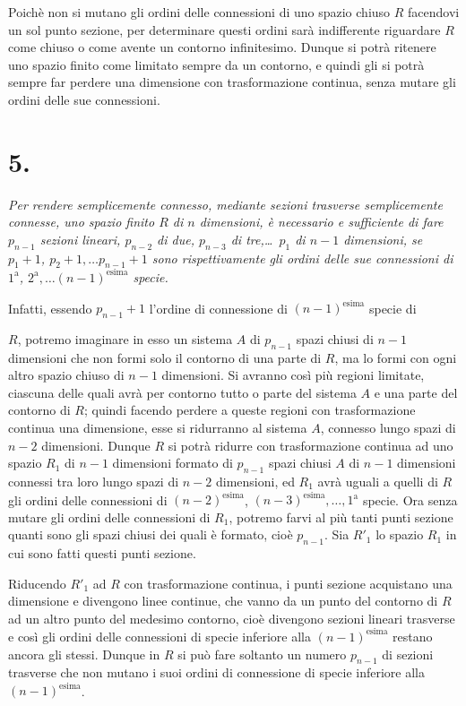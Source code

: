\documentclass{article}
\begin{document}
Poichè non si mutano gli ordini delle connessioni di uno spazio chiuso $R$ facendovi un sol punto sezione, per determinare questi ordini sarà indifferente riguardare $R$ come chiuso o come avente un contorno infinitesimo. Dunque si potrà ritenere uno spazio finito come limitato sempre da un contorno, e quindi gli si potrà sempre far perdere una dimensione con trasformazione continua, senza mutare gli ordini delle sue connessioni.

\section*{5.}

\emph{Per rendere semplicemente connesso, mediante sezioni trasverse semplicemente connesse, uno spazio finito $R$ di $n$ dimensioni, è necessario e sufficiente di fare $p_{n-1}$ sezioni lineari, $p_{n-2}$ di due, $p_{n-3}$ di tre,\ldots\ $p_{1}$ di $n-1$ dimensioni, se $p_{1}+1$, $p_{2}+1,\ldots p_{n-1}+1$ sono rispettivamente gli ordini delle sue connessioni di $1^{\text{a}}$, $2^{\text{a}},\ldots (n-1)^{\text{esima}}$ specie.}

Infatti, essendo $p_{n-1}+1$ l'ordine di connessione di $(n-1)^{\text{esima}}$ specie di

$R$, potremo imaginare in esso un sistema $A$ di $p_{n-1}$ spazi chiusi di $n-1$ dimensioni che non formi solo il contorno di una parte di $R$, ma lo formi con ogni altro spazio chiuso di $n-1$ dimensioni. Si avranno così più regioni limitate, ciascuna delle quali avrà per contorno tutto o parte del sistema $A$ e una parte del contorno di $R$; quindi facendo perdere a queste regioni con trasformazione continua una dimensione, esse si ridurranno al sistema $A$, connesso lungo spazi di $n-2$ dimensioni. Dunque $R$ si potrà ridurre con trasformazione continua ad uno spazio $R_{1}$ di $n-1$ dimensioni formato di $p_{n-1}$ spazi chiusi $A$ di $n-1$ dimensioni connessi tra loro lungo spazi di $n-2$ dimensioni, ed $R_{1}$ avrà uguali a quelli di $R$ gli ordini delle connessioni di $(n-2)^{\text{esima}}$, $(n-3)^{\text{esima}},\ldots, 1^{\text{a}}$ specie. Ora senza mutare gli ordini delle connessioni di $R_{1}$, potremo farvi al più tanti punti sezione quanti sono gli spazi chiusi dei quali è formato, cioè $p_{n-1}$. Sia $R'_{1}$ lo spazio $R_{1}$ in cui sono fatti questi punti sezione.

Riducendo $R'_{1}$ ad $R$ con trasformazione continua, i punti sezione acquistano una dimensione e divengono linee continue, che vanno da un punto del contorno di $R$ ad un altro punto del medesimo contorno, cioè divengono sezioni lineari trasverse e così gli ordini delle connessioni di specie inferiore alla $(n-1)^{\text{esima}}$ restano ancora gli stessi. Dunque in $R$ si può fare soltanto un numero $p_{n-1}$ di sezioni trasverse che non mutano i suoi ordini di connessione di specie inferiore alla $(n-1)^{\text{esima}}$.
\end{document}
